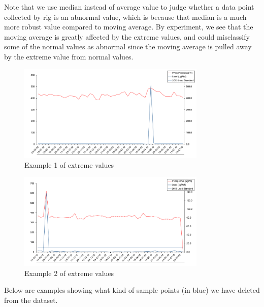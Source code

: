 \documentclass[11pt,twoside]{article}
\numberwithin{Theorem}{section}
\numberwithin{Definition}{section}
\numberwithin{Lemma}{section}
\numberwithin{Algorithm}{section}
\numberwithin{equation}{section}
\begin{document}
Note that we use median instead of average value to judge whether a data point collected by rig is an abnormal value, which is because that median is a much more robust value compared to moving average. By experiment, we see that the moving average is greatly affected by the extreme values, and could misclassify some of the normal values as abnormal since the moving average is pulled away by the extreme value from normal values.

\begin{figure}[!ht]
    \centering
    \includegraphics[width=0.8\textwidth]{p1.png}
    \caption{Example 1 of extreme values}
    \end{figure}

\begin{figure}[!ht]
    \centering
    \includegraphics[width=0.8\textwidth]{p2.png}
    \caption{Example 2 of extreme values}
    \end{figure}

Below are examples showing what kind of sample points (in blue) we have deleted from the dataset.
\end{document}
